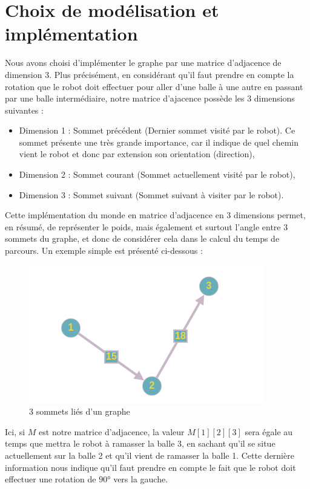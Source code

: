 \documentclass[12pt]{article}
\begin{document}
    \section{Choix de modélisation et implémentation}

    Nous avons choisi d'implémenter le graphe par une matrice d'adjacence de dimension 3. Plus précisément, en considérant qu'il faut prendre en compte la rotation que le robot doit effectuer pour aller d'une balle à une autre en passant par une balle intermédiaire, notre matrice d'ajacence possède les 3 dimensions suivantes :

    \begin{itemize}
        \item Dimension 1 : Sommet précédent (Dernier sommet visité par le robot). Ce sommet présente une très grande importance, car il indique de quel chemin vient le robot et donc par extension son orientation (direction),
        \item Dimension 2 : Sommet courant (Sommet actuellement visité par le robot),
        \item Dimension 3 : Sommet suivant (Sommet suivant à visiter par le robot).
    \end{itemize}

    Cette implémentation du monde en matrice d'adjacence en 3 dimensions permet, en résumé, de représenter le poids, mais également et surtout l'angle entre 3 sommets du graphe, et donc de considérer cela dans le calcul du temps de parcours. Un exemple simple est présenté ci-dessous :

    \begin{figure}[H]
        \centering
        \includegraphics[scale=0.7]{img/example_3dim}
        \caption{3 sommets liés d'un graphe}
        \label{img_3somlinked}
    \end{figure}

    Ici, si $M$ est notre matrice d'adjacence, la valeur $M[1][2][3]$ sera égale au temps que mettra le robot à ramasser la balle 3, en sachant qu'il se situe actuellement sur la balle 2 et qu'il vient de ramasser la balle 1. Cette dernière information nous indique qu'il faut prendre en compte le fait que le robot doit effectuer une rotation de $90$° vers la gauche.
\end{document}
